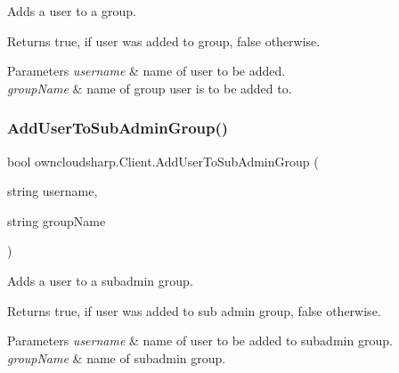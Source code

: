 Adds a user to a group. 

\begin{DoxyReturn}{Returns}
{\ttfamily true}, if user was added to group, {\ttfamily false} otherwise.
\end{DoxyReturn}

\begin{DoxyParams}{Parameters}
{\em username} & name of user to be added.\\
\hline
{\em group\+Name} & name of group user is to be added to.\\
\hline
\end{DoxyParams}
\mbox{\label{classowncloudsharp_1_1_client_a99a393c20b57e50c10ee337b09ed75b3}} 
\subsubsection{\texorpdfstring{Add\+User\+To\+Sub\+Admin\+Group()}{AddUserToSubAdminGroup()}}
{\footnotesize\ttfamily bool owncloudsharp.\+Client.\+Add\+User\+To\+Sub\+Admin\+Group (\begin{DoxyParamCaption}\item[{string}]{username,  }\item[{string}]{group\+Name }\end{DoxyParamCaption})}



Adds a user to a subadmin group. 

\begin{DoxyReturn}{Returns}
{\ttfamily true}, if user was added to sub admin group, {\ttfamily false} otherwise.
\end{DoxyReturn}

\begin{DoxyParams}{Parameters}
{\em username} & name of user to be added to subadmin group.\\
\hline
{\em group\+Name} & name of subadmin group.\\
\hline
\end{DoxyParams}
\mbox{\label{classowncloudsharp_1_1_client_ad20dcb23c0158e491d54401b2809b903}} 
